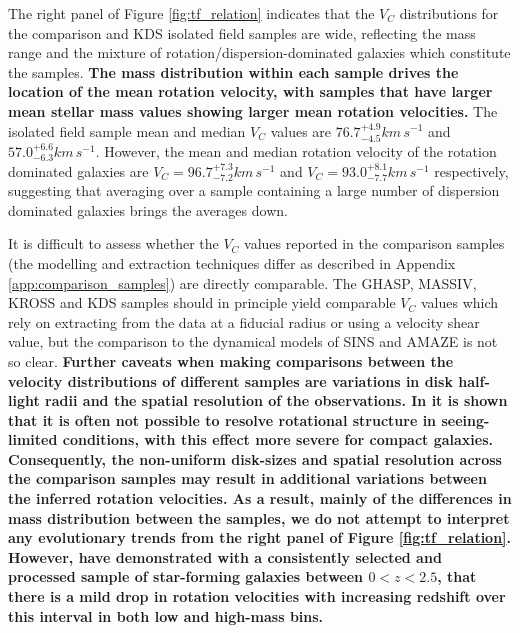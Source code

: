 \documentclass[fleqn,usenatbib]{mnras}
\begin{document}
The right panel of Figure \ref{fig:tf_relation} indicates that the $V_{C}$ distributions for the comparison and KDS isolated field samples are wide, reflecting the mass range and the mixture of rotation/dispersion-dominated galaxies which constitute the samples.
\textbf{The mass distribution within each sample drives the location of the mean rotation velocity, with samples that have larger mean stellar mass values showing larger mean rotation velocities.}
The isolated field sample mean and median $V_{C}$ values are $76.7^{+4.9}_{-4.5}km\,s^{-1}$ and $57.0^{+6.6}_{-6.3}km\,s^{-1}$.
However, the mean and median rotation velocity of the rotation dominated galaxies are $V_{C} = 96.7^{+7.3}_{-7.2}km\,s^{-1}$ and $V_{C} = 93.0^{+8.1}_{-7.7}km\,s^{-1}$ respectively, suggesting that averaging over a sample containing a large number of dispersion dominated galaxies brings the averages down.

It is difficult to assess whether the $V_{C}$ values reported in the comparison samples (the modelling and extraction techniques differ as described in Appendix \ref{app:comparison_samples}) are directly comparable.
The GHASP, MASSIV, KROSS and KDS samples should in principle yield comparable $V_{C}$ values which rely on extracting from the data at a fiducial radius or using a velocity shear value, but the comparison to the dynamical models of SINS and AMAZE is not so clear.
\textbf{Further caveats when making comparisons between the velocity distributions of different samples are variations in disk half-light radii and the spatial resolution of the observations. 
In \cite{Newman2013} it is shown that it is often not possible to resolve rotational structure in seeing-limited conditions, with this effect more severe for compact galaxies. 
Consequently, the non-uniform disk-sizes and spatial resolution across the comparison samples may result in additional variations between the inferred rotation velocities. 
As a result, mainly of the differences in mass distribution between the samples, we do not attempt to interpret any evolutionary trends from the right panel of Figure \ref{fig:tf_relation}.
However, \cite{Simons2017} have demonstrated with a consistently selected and processed sample of star-forming galaxies between $0 < z < 2.5$, that there is a mild drop in rotation velocities with increasing redshift over this interval in both low and high-mass bins.} 
\end{document}
